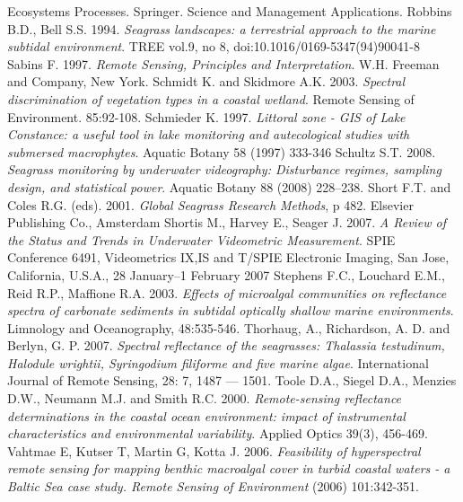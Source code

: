 \documentclass[10pt, a4paper]{article}
\begin{document}
\begin{thebibliography}{999}
{Ecosystems Processes}. Springer. Science and Management Applications. \pageref{Richardson06}
Robbins B.D., Bell S.S. 1994. \emph{Seagrass landscapes: a terrestrial approach to the marine
subtidal environment}. TREE vol.9, no 8, doi:10.1016/0169-5347(94)90041-8 \pageref{Robbins94}
Sabins F. 1997. \emph{Remote Sensing, Principles and Interpretation}. W.H. Freeman and
Company, New York. \pageref{Sabins97}
Schmidt K. and Skidmore A.K. 2003. \emph{Spectral discrimination of vegetation types in a
coastal wetland}. Remote Sensing of Environment. 85:92-108. \pageref{Schmidt03}
Schmieder K. 1997. \emph{Littoral zone - GIS of Lake Constance: a useful tool in lake
monitoring and autecological studies with submersed macrophytes}. Aquatic Botany 58
(1997) 333-346 \pageref{Schmieder97}
Schultz S.T. 2008. \emph{Seagrass monitoring by underwater videography: Disturbance
regimes, sampling design, and statistical power}. Aquatic Botany 88 (2008) 228–238. \pageref{Schultz08}
Short F.T. and Coles R.G. (eds). 2001. \emph{Global Seagrass Research Methods}, p 482.
Elsevier Publishing Co., Amsterdam \pageref{Short01}
Shortis M., Harvey E., Seager J. 2007. \emph{A Review of the Status and Trends in Underwater
Videometric Measurement}. SPIE Conference 6491, Videometrics IX,IS and T/SPIE Electronic
Imaging, San Jose, California, U.S.A., 28 January–1 February 2007 \pageref{Shortis07}
Stephens F.C., Louchard E.M., Reid R.P., Maffione R.A. 2003. \emph{Effects of microalgal
communities on reflectance spectra of carbonate sediments in subtidal optically shallow
marine environments}. Limnology and Oceanography, 48:535-546. \pageref{Stephens03}
Thorhaug, A., Richardson, A. D. and Berlyn, G. P. 2007. \emph{Spectral reflectance of the
seagrasses: Thalassia testudinum, Halodule wrightii, Syringodium filiforme and five marine
algae}. International Journal of Remote Sensing, 28: 7, 1487 — 1501. \pageref{Thorhaug07}
Toole D.A., Siegel D.A., Menzies D.W., Neumann M.J. and Smith R.C. 2000. 
\emph{Remote-sensing reflectance determinations in the coastal ocean
environment: impact of instrumental characteristics and environmental variability}. Applied
Optics 39(3), 456-469. \pageref{Toole00}
Vahtmae E, Kutser T, Martin G, Kotta J. 2006. \emph{Feasibility of hyperspectral remote
sensing for mapping benthic macroalgal cover in turbid coastal waters - a Baltic Sea case
study. Remote Sensing of Environment} (2006) 101:342-351. \pageref{Vahtmae06}

\end{thebibliography}
\end{document}

